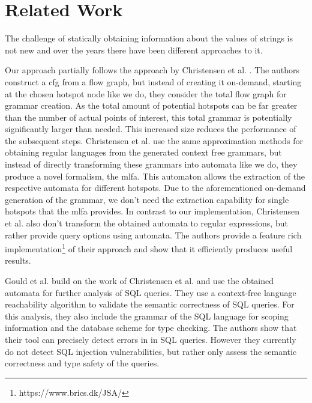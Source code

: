 \chapter{Related Work}
\label{chapter:RelatedWork}

The challenge of statically obtaining information about the values of strings is not new and over the years there have been different approaches to it.

Our approach partially follows the approach by Christensen et al. \cite{brics}. The authors construct a \acl{cfg} from a flow graph, but instead of creating it on-demand, starting at the chosen hotspot node like we do, they consider the total flow graph for grammar creation.
As the total amount of potential hotspots can be far greater than the number of actual points of interest, this total grammar is potentially significantly larger than needed. This increased size reduces the performance of the subsequent steps.
Christensen et al. use the same approximation methods for obtaining regular languages from the generated context free grammars, but instead of directly transforming these grammars into automata like we do, they produce a novel formalism, the \ac{mlfa}.
This automaton allows the extraction of the respective automata for different hotspots. Due to the aforementioned on-demand generation of the grammar, we don't need the extraction capability for single hotspots that the \ac{mlfa} provides. In contrast to our implementation, Christensen et al. also don't transform the obtained automata to regular expressions, but rather provide query options using automata.
The authors provide a feature rich implementation\footnote{https://www.brics.dk/JSA/} of their approach and show that it efficiently produces useful results.

Gould et al. \cite{gould2004static} build on the work of Christensen et al. and use the obtained automata for further analysis of SQL queries. They use a context-free language reachability algorithm to validate the semantic correctness of SQL queries. For this analysis, they also include the grammar of the SQL language for scoping information and the database scheme for type checking.
The authors show that their tool can precisely detect errors in in SQL queries. However they currently do not detect SQL injection vulnerabilities, but rather only assess the semantic correctness and type safety of the queries.

